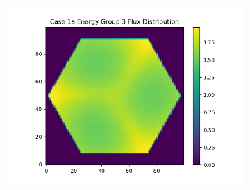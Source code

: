 \documentclass[letterpaper,11pt]{report}
\begin{document}
\begin{figure}[H]
\begin{subfigure}{.33\textwidth}
        \caption{}
      \end{subfigure}
      \begin{subfigure}{.33\textwidth}
        \centering
        \includegraphics[width=1.1\linewidth]{../../phase1a/case1a/analysis_output/p1a_1a_e_eg3.png}
        \caption{}
      \end{subfigure}


\end{figure}
\end{document}
